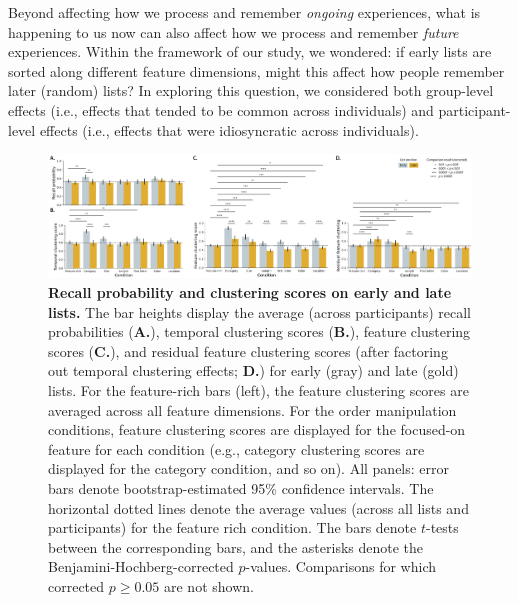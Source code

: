 \documentclass[11pt]{article}
\newcommand{\abbreviations}{S1}
\begin{document}
Beyond affecting how we process and remember \textit{ongoing} experiences, what
is happening to us now can also affect how we process and remember
\textit{future} experiences. Within the framework of our study, we wondered: if
early lists are sorted along different feature dimensions, might this affect
how people remember later (random) lists? In exploring this question, we
considered both group-level effects (i.e., effects that tended to be common
across individuals) and participant-level effects (i.e., effects that were
idiosyncratic across individuals).

\begin{figure}

    \centering
    \includegraphics[width=\textwidth]{figures/memory_perf_barchart_compare}

\caption{\textbf{Recall probability and clustering scores on early and late
lists.} The bar heights display the average (across participants) recall
probabilities (\textbf{A.}), temporal clustering scores (\textbf{B.}), feature
clustering scores (\textbf{C.}), and residual feature clustering scores (after
factoring out temporal clustering effects; \textbf{D.}) for early (gray) and
late (gold) lists. For the feature-rich bars (left), the feature clustering
scores are averaged across all feature dimensions. For the order manipulation
conditions, feature clustering scores are displayed for the focused-on feature
for each condition (e.g., category clustering scores are displayed for the
category condition, and so on). All panels: error bars denote
bootstrap-estimated 95\% confidence intervals. The horizontal dotted lines
denote the average values (across all lists and participants) for the feature
rich condition. The bars denote $t$-tests between the corresponding bars, and
the asterisks denote the Benjamini-Hochberg-corrected $p$-values. Comparisons
for which corrected $p \geq 0.05$ are not shown.} \label{fig:barplots}

\end{figure}


\begin{table}[tp]
\centering
\tiny


\caption{\textbf{Comparing accuracy on late lists in order-manipulation versus
feature-rich conditions.} The independent samples $t$-tests reported in the
table were carried out across-participants, and reflect data aggregated across
all late lists from each participant. Abbreviations used in this table are
defined in Table~\abbreviations.}

\label{tab:accuracy-carryover}
\end{table}
\end{document}

